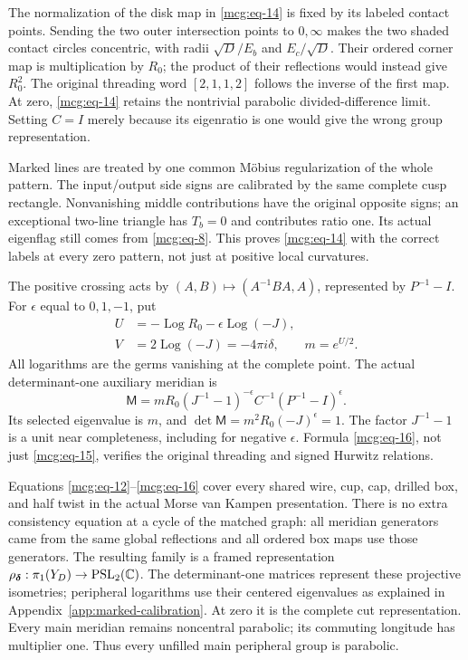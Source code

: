 The normalization of the disk map in \eqref{mcg:eq-14} is fixed by its labeled contact points. Sending
the two outer intersection points to \(0,\infty\) makes the two shaded
contact circles concentric, with radii \(\sqrt D/E_b\) and
\(E_c/\sqrt D\). Their ordered corner map is multiplication by \(R_0\);
the product of their reflections would instead give \(R_0^2\). The
original threading word \([2,1,1,2]\) follows the inverse of the first
map. At zero, \eqref{mcg:eq-14} retains the nontrivial parabolic
divided-difference limit. Setting \(C=I\) merely because its eigenratio
is one would give the wrong group representation.

Marked lines are treated by one common Möbius regularization of the
whole pattern. The input/output side signs are calibrated by the same
complete cusp rectangle. Nonvanishing middle contributions have the
original opposite signs; an exceptional two-line triangle has \(T_b=0\)
and contributes ratio one. Its actual eigenflag still comes from
\eqref{mcg:eq-8}. This proves \eqref{mcg:eq-14} with the correct labels
at every zero pattern, not just at positive local curvatures.

The positive crossing acts by \((A,B)\mapsto(A^{-1}BA,A)\), represented
by \(P^{-1}-I\). For \(\epsilon\) equal to \(0,1,-1\), put \begin{equation}\label{mcg:eq-15}
\begin{aligned}
 U&=-\operatorname{Log}R_0-\epsilon\operatorname{Log}(-J),\\
 V&=2\operatorname{Log}(-J)=-4\pi i\delta,\qquad
 m=e^{U/2}.
\end{aligned}
\end{equation} All logarithms are the germs vanishing at the complete point. The
actual determinant-one auxiliary meridian is \begin{equation}\label{mcg:eq-16}
{\mathsf M}
 =mR_0(J^{-1}-1)^{-\epsilon}
        C^{-1}(P^{-1}-I)^\epsilon.
\end{equation} Its selected eigenvalue is \(m\), and
\(\det{\mathsf M}=m^2R_0(-J)^\epsilon=1\). The factor \(J^{-1}-1\) is a
unit near completeness, including for negative \(\epsilon\). Formula
\eqref{mcg:eq-16}, not just \eqref{mcg:eq-15}, verifies the original
threading and signed Hurwitz relations.

Equations \eqref{mcg:eq-12}--\eqref{mcg:eq-16} cover every shared wire,
cup, cap, drilled box, and half twist in the actual Morse van Kampen
presentation. There is no extra consistency equation at a cycle of the
matched graph: all meridian generators came from the same global reflections and all
ordered box maps use those generators. The resulting family is a framed representation
$\rho_{\boldsymbol\delta}:\pi_1(Y_D)\to\mathrm{PSL}_2(\mathbb C)$.
The determinant-one matrices represent these projective isometries;
peripheral logarithms use their centered eigenvalues as explained in
Appendix~\ref{app:marked-calibration}. At zero it is the complete cut representation. Every
main meridian remains noncentral parabolic; its commuting longitude has
multiplier one. Thus every unfilled main peripheral group is parabolic.

